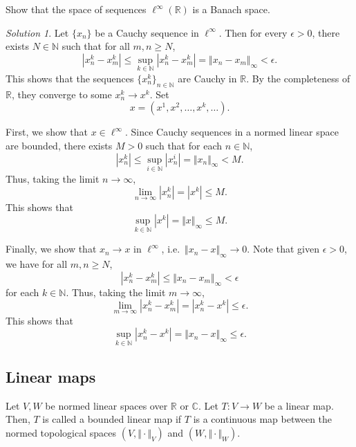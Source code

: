 \documentclass[11pt]{article}
\newcommand{\C}{\mathbb{C}}
\newcommand{\R}{\mathbb{R}}
\newcommand{\N}{\mathbb{N}}
\newcommand{\norm}[1]{\Vert #1 \Vert}
\theoremstyle{definition}
\theoremstyle{remark}
\newtheorem*{solution}{Solution}
\begin{document}
    \begin{exercise}
        Show that the space of sequences $\ell^\infty(\R)$ is a Banach space.
        \begin{solution}
            Let $\{x_n\}$ be a Cauchy sequence in $\ell^\infty$. Then for every
            $\epsilon > 0$, there exists $N \in \N$ such that for all $m, n \geq N$,
            \[
                |x_n^k - x_m^k| \leq \sup_{k \in \N} |x_n^k - x_m^k| = \norm{x_n -
                x_m}_\infty < \epsilon.
            \] This shows that the sequences $\{x_n^k\}_{n \in \N}$ are Cauchy in
            $\R$. By the completeness of $\R$, they converge to some $x_n^k \to x^k$.
            Set \[
                x = (x^1, x^2, \dots, x^k, \dots).
            \]

            First, we show that $x \in \ell^\infty$. Since Cauchy sequences in a
            normed linear space are bounded, there exists $M > 0$ such that for each
            $n \in \N$, \[
                |x_n^k| \leq \sup_{i \in \N} |x_n^i| = \norm{x_n}_\infty < M.
            \] Thus, taking the limit $n \to \infty$, \[
                \lim_{n \to \infty} |x_n^k| = |x^k| \leq M.
            \] This shows that \[
                \sup_{k \in \N} |x^k| = \norm{x}_\infty \leq M.
            \]

            Finally, we show that $x_n \to x$ in $\ell^\infty$, i.e.\ $\norm{x_n -
            x}_\infty \to 0$. Note that given $\epsilon > 0$, we have for all $m, n
            \geq N$, \[
                |x_n^k - x_m^k| \leq \norm{x_n - x_m}_\infty < \epsilon
            \] for each $k \in \N$. Thus, taking the limit $m \to \infty$, \[
                \lim_{m \to \infty} |x_n^k - x_m^k| = |x_n^k - x^k| \leq \epsilon.
            \] This shows that \[
                \sup_{k \in \N} |x_n^k - x^k| = \norm{x_n - x}_\infty \leq \epsilon.
            \]
        \end{solution}
    \end{exercise}


    \subsection{Linear maps}

    \begin{definition}
        Let $V, W$ be normed linear spaces over $\R$ or $\C$. Let $T\colon V \to W$
        be a linear map. Then, $T$ is called a bounded linear map if $T$ is a
        continuous map between the normed topological spaces $(V, \norm{\cdot}_V)$
        and $(W, \norm{\cdot}_W)$.
    \end{definition}
\end{document}
